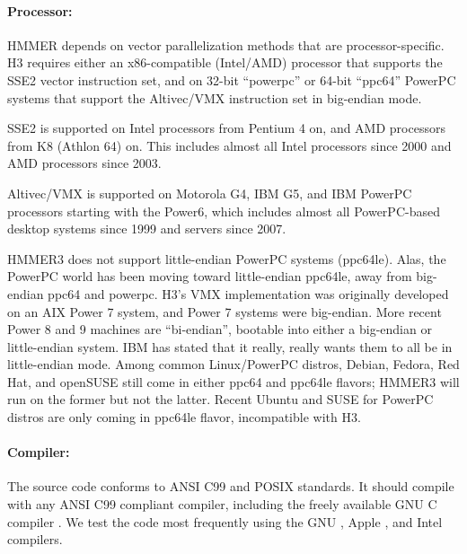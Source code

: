 \paragraph{Processor:} HMMER depends on vector parallelization methods
that are processor-specific. H3 requires either an x86-compatible
(Intel/AMD) processor that supports the SSE2 vector instruction set,
and on 32-bit ``powerpc'' or 64-bit ``ppc64'' PowerPC systems that
support the Altivec/VMX instruction set in big-endian mode.

SSE2 is supported on Intel processors from Pentium 4 on, and AMD
processors from K8 (Athlon 64) on. This includes almost all Intel
processors since 2000 and AMD processors since 2003.

Altivec/VMX is supported on Motorola G4, IBM G5, and IBM PowerPC
processors starting with the Power6, which includes almost all
PowerPC-based desktop systems since 1999 and servers since
2007.

HMMER3 does not support little-endian PowerPC systems (ppc64le). Alas,
the PowerPC world has been moving toward little-endian ppc64le, away
from big-endian ppc64 and powerpc. H3's VMX implementation was
originally developed on an AIX Power 7 system, and Power 7 systems
were big-endian. More recent Power 8 and 9 machines are ``bi-endian'',
bootable into either a big-endian or little-endian system. IBM has
stated that it really, really wants them to all be in little-endian
mode. Among common Linux/PowerPC distros, Debian, Fedora, Red Hat, and
openSUSE still come in either ppc64 and ppc64le flavors; HMMER3 will
run on the former but not the latter. Recent Ubuntu and SUSE for
PowerPC distros are only coming in ppc64le flavor, incompatible with
H3.

\paragraph{Compiler:} The source code conforms to ANSI
C99 and POSIX standards. It should compile with any ANSI C99 compliant
compiler, including the freely available GNU C compiler .
We test the code most frequently using the GNU , Apple
, and Intel  compilers.


